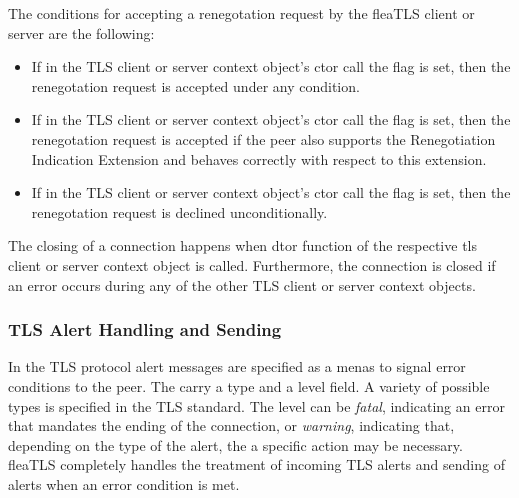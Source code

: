 \documentclass[a4paper,11pt]{scrartcl}
\begin{document}
  The conditions for accepting a renegotation request by the  fleaTLS client or
  server are the following:
  \begin{itemize}
    \item If in the TLS client or server context object's ctor call the flag  is
      set, then the renegotation request is accepted under any condition.
    \item If in the TLS client or server context object's ctor call the flag  is
      set, then the renegotation request is accepted if the peer also supports
      the Renegotiation Indication Extension and behaves correctly with respect
      to this extension.
      \item If in the TLS client or server context object's ctor call the flag  is
      set, then the renegotation request is declined unconditionally.
  \end{itemize}

  The closing of a connection happens when dtor function of the respective tls
  client or server context object is called. Furthermore, the connection is
  closed if an error occurs during any of the other TLS client or server context
  objects.

  \subsubsection{TLS Alert Handling and Sending }

  In the TLS protocol alert messages are specified as a menas to signal error
  conditions to the peer. The carry a type and a level field. A variety of possible types
  is specified in the TLS standard. The level can be \emph{fatal}, indicating an error
  that mandates the ending of the connection, or \emph{warning}, indicating that,
  depending on the type of the alert, the a specific action may be necessary.
  fleaTLS completely handles the treatment of incoming
  TLS alerts and sending of alerts when an error condition is met.
\end{document}
